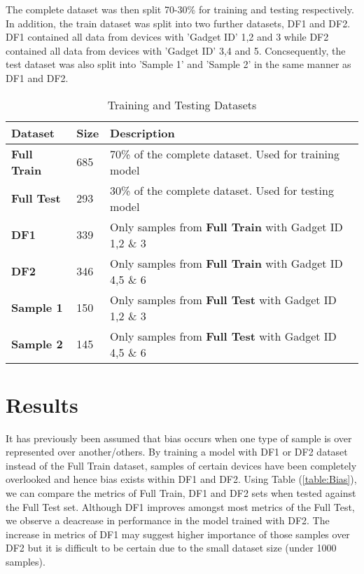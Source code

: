 The complete dataset was then split 70-30\% for training and testing respectively. 
In addition, the train dataset was split into two further datasets, DF1 and DF2. 
DF1 contained all data from devices with 'Gadget ID' 1,2 and 3 while DF2 contained all data from devices with 'Gadget ID' 3,4 and 5.
Concsequently, the test dataset was also split into 'Sample 1' and 'Sample 2' in the same manner as DF1 and DF2.

\begin{table}[H]
    \begin{center}
        \caption{Training and Testing Datasets}
        \label{table:datasets} 
        \begin{tabular}{l|l|l}
            \toprule
            \textbf{Dataset} & \textbf{Size} &\textbf{Description} \\ [0.5ex]
            \midrule
            \textbf{Full Train} &685& 70\% of the complete dataset. Used for training model \\
            \textbf{Full Test}  &293& 30\% of the complete dataset. Used for testing model \\
            \textbf{DF1}        &339& Only samples from \textbf{Full Train} with Gadget ID 1,2 \& 3 \\
            \textbf{DF2}        &346& Only samples from \textbf{Full Train} with Gadget ID 4,5 \& 6 \\
            \textbf{Sample 1}   &150& Only samples from \textbf{Full Test} with Gadget ID 1,2 \& 3 \\
            \textbf{Sample 2}   &145& Only samples from \textbf{Full Test} with Gadget ID 4,5 \& 6 \\
            \bottomrule
        \end{tabular}
    \end{center}
\end{table}

\section{Results}
It has previously been assumed that bias occurs when one type of sample is over represented over another/others.
By training a model with DF1 or DF2 dataset instead of the Full Train dataset, samples of certain devices have been completely overlooked and hence bias exists within DF1 and DF2. 
Using Table (\ref{table:Bias}), we can compare the metrics of Full Train, DF1 and DF2 sets when tested against the Full Test set.
Although DF1 improves amongst most metrics of the Full Test, we observe a deacrease in performance in the model trained with DF2.
The increase in metrics of DF1 may suggest higher importance of those samples over DF2 but it is difficult to be certain due to the small dataset size (under 1000 samples).


